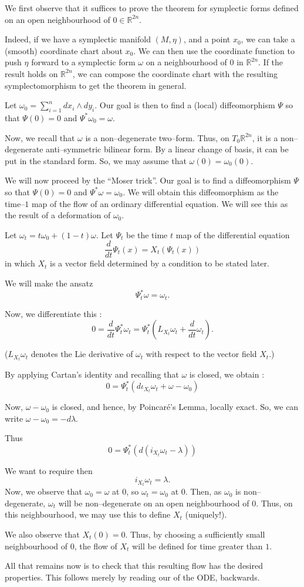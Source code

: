 \documentclass[12pt]{article}
\newcommand{\R}{\mathbb{R}^{2n}}
\begin{document}
We first observe that it suffices to prove the theorem for symplectic
forms defined on an open neighbourhood of $0 \in \R$.

Indeed, if we have a symplectic manifold $(M, \eta)$, and a point
$x_0$, we can take a (smooth) coordinate chart about $x_0$.  We can then
use the coordinate function to push $\eta$ forward to a symplectic form
$\omega$ on a neighbourhood of $0$ in $\R$.  If the result holds on $\R$,
we can compose the coordinate chart with the resulting symplectomorphism to
get the theorem in general.

Let $\omega_0 = \sum_{i=1}^{n} dx_i \wedge dy_i$.  Our goal is then to find a (local) diffeomorphism $\Psi$ so that $\Psi(0) = 0$ and $\Psi^*\omega_0 = \omega$.

Now, we recall that $\omega$ is a non--degenerate two--form.  Thus, on
$T_{0} \R$, it is a non--degenerate anti--symmetric bilinear form.  By a linear change of basis, it can be put in the standard form.  So, we
may assume that $\omega(0) = \omega_0(0)$.

We will now proceed by the ``Moser trick''.  Our goal is to find a
diffeomorphism $\Psi$ so that $\Psi(0) = 0$ and $\Psi^*\omega =
\omega_0$.
We will obtain this diffeomorphism as the time--$1$ map of the
flow of an ordinary differential equation.  We will see this as the
result of a deformation of $\omega_0$.

Let $\omega_t = t \omega_0 + (1-t) \omega$.
Let $\Psi_{t}$ be the time $t$ map of the differential equation
 $$\frac{d}{dt} \Psi_t(x) = X_t(\Psi_t(x))$$
in which $X_t$ is a vector field determined by a condition to be stated later.  

We will make the ansatz $$\Psi_{t}^* \omega = \omega_t.$$

Now, we differentiate this :
$$ 0 = \frac{d}{dt} \Psi_t^*\omega_t = \Psi_t^*( L_{X_t}\omega_t +
\frac{d}{dt} \omega_t). $$

($L_{X_t}\omega_t$ denotes the Lie derivative of $\omega_t$ with respect
to the vector field $X_t$.)

By applying Cartan's identity and recalling that $\omega$ is closed, we
obtain :
$$ 0 = \Psi_t^*(d \iota_{X_t} \omega_t + \omega - \omega_0) $$

Now, $\omega - \omega_0$ is closed, and hence, by Poincar\'e's Lemma,
locally exact.	So, we can write $\omega - \omega_0 = - d\lambda$.

Thus $$ 0 = \Psi_t^*( d ( i_{X_t} \omega_t - \lambda )) $$

We want to require then $$ i_{X_t} \omega_t = \lambda. $$  Now, we observe that
$\omega_0 = \omega$ at $0$, so $\omega_t = \omega_0$ at $0$.  Then, as
$\omega_0$ is non--degenerate, $\omega_t$ will be non--degenerate on an
open neighbourhood of $0$.  Thus, on this neighbourhood, we may use this to
define $X_t$ (uniquely!).

We also observe that $X_t(0) = 0$.  Thus, by choosing a sufficiently
small neighbourhood of $0$, the flow of $X_t$ will be defined for time
greater than $1$.

All that remains now is to check that this resulting flow has the desired
properties.  This follows merely by reading our  of the ODE,
backwards.
\end{document}
